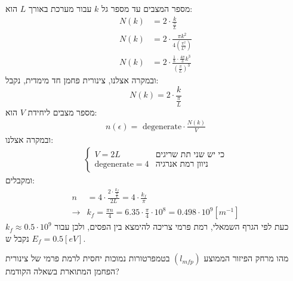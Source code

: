 \documentclass{article}
\begin{document}
\begin{Answer}
מספר המצבים עד מספר גל $k$ עבור מערכת באורך $L$ הוא:
\begin{align}\label{מספר מצבים}
    N\left( k \right)&=2\cdot\frac{k}{\frac{\pi}{L}}\tag{1d}\\
    N\left( k \right)&=2\cdot\frac{\pi k^{2}}{4\left( \frac{\pi^2}{L^{2}} \right)}\tag{2d}\\
    N\left( k \right)&=2\cdot\frac{\frac{1}{8}\cdot\frac{4\pi}{3}k^{3}}{\left( \frac{\pi}{L} \right)^{3}}\tag{3d}
\end{align}
ובמקרה אצלנו, צינורית פחמן חד מימדית, נקבל:
$$N\left( k \right)=2\cdot\frac{k}{\frac{\pi}{L}}$$
מספר מצבים ליחידת $V$ הוא:
\begin{align}
    n\left( \epsilon \right)=\text{ degenerate}\cdot \frac{N\left( k \right)}{V}
\end{align}
ובמקרה אצלנו:
\begin{align*}
    \begin{cases}
        V=2L&\text{כי יש שני תת שריגים}\\
        \text{degenerate}=4&\text{ניוון רמת אנרגיה}
    \end{cases}
\end{align*}
ומקבלים:
\begin{align*}
    n&=4\cdot \frac{2\cdot\frac{k_{f}}{\frac{\pi}{L}}}{2L}=4\cdot \frac{k_{f}}{\pi}\\
    \longrightarrow& k_{f}=\frac{\pi n}{4}=6.35\cdot \frac{\pi}{4}\cdot 10^{8}=0.498\cdot 10^{9}\left[ m^{-1} \right]
\end{align*}
כעת לפי הגרף השמאלי, רמת פרמי צריכה להימצא בין הפסים, ולכן עבור $k_{f}\approx0.5\cdot10^{9}$ נקבל ש $E_{f}=0.5\left[ eV \right]$.
\end{Answer}
\begin{Question}
מהו מרחק הפיזור הממוצע ${\left( l_{mfp} \right)}$ בטמפרטורות נמוכות יחסית לרמת פרמי של צינורית הפחמן המתוארת בשאלה הקודמת?
\end{Question}
\end{document}

